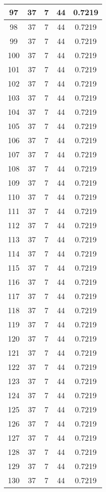 \documentclass[letterpaper, 12pt]{article}
\begin{document}
\begin{longtable}{|c|c|c|c|c|}
\hline
97 & 37 & 7 & 44 & 0.7219 \\
\hline
98 & 37 & 7 & 44 & 0.7219 \\
\hline
99 & 37 & 7 & 44 & 0.7219 \\
\hline
100 & 37 & 7 & 44 & 0.7219 \\
\hline
101 & 37 & 7 & 44 & 0.7219 \\
\hline
102 & 37 & 7 & 44 & 0.7219 \\
\hline
103 & 37 & 7 & 44 & 0.7219 \\
\hline
104 & 37 & 7 & 44 & 0.7219 \\
\hline
105 & 37 & 7 & 44 & 0.7219 \\
\hline
106 & 37 & 7 & 44 & 0.7219 \\
\hline
107 & 37 & 7 & 44 & 0.7219 \\
\hline
108 & 37 & 7 & 44 & 0.7219 \\
\hline
109 & 37 & 7 & 44 & 0.7219 \\
\hline
110 & 37 & 7 & 44 & 0.7219 \\
\hline
111 & 37 & 7 & 44 & 0.7219 \\
\hline
112 & 37 & 7 & 44 & 0.7219 \\
\hline
113 & 37 & 7 & 44 & 0.7219 \\
\hline
114 & 37 & 7 & 44 & 0.7219 \\
\hline
115 & 37 & 7 & 44 & 0.7219 \\
\hline
116 & 37 & 7 & 44 & 0.7219 \\
\hline
117 & 37 & 7 & 44 & 0.7219 \\
\hline
118 & 37 & 7 & 44 & 0.7219 \\
\hline
119 & 37 & 7 & 44 & 0.7219 \\
\hline
120 & 37 & 7 & 44 & 0.7219 \\
\hline
121 & 37 & 7 & 44 & 0.7219 \\
\hline
122 & 37 & 7 & 44 & 0.7219 \\
\hline
123 & 37 & 7 & 44 & 0.7219 \\
\hline
124 & 37 & 7 & 44 & 0.7219 \\
\hline
125 & 37 & 7 & 44 & 0.7219 \\
\hline
126 & 37 & 7 & 44 & 0.7219 \\
\hline
127 & 37 & 7 & 44 & 0.7219 \\
\hline
128 & 37 & 7 & 44 & 0.7219 \\
\hline
129 & 37 & 7 & 44 & 0.7219 \\
\hline
130 & 37 & 7 & 44 & 0.7219 \\

\end{longtable}
\end{document}
